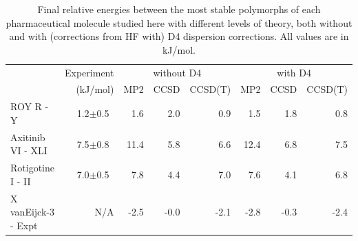 \begin{table}[h]

\caption{\label{tab:final_relative_energies}Final relative energies between the most stable polymorphs of each pharmaceutical molecule studied here with different levels of theory, both without and with (corrections from HF with) D4 dispersion corrections. All values are in kJ/mol.}
\begin{tabular}{lrrrrrrr}
\toprule
 & Experiment & \multicolumn{3}{c}{without D4} & \multicolumn{3}{c}{with D4} \\ \cmidrule(lr){3-5} \cmidrule(lr){6-8} 
 & (kJ/mol) & MP2 & CCSD & CCSD(T) & MP2 & CCSD & CCSD(T) \\
\midrule
ROY R - Y & 1.2$\pm$0.5~\cite{yuPolymorphismMolecularSolids2010b} & 1.6 & 2.0 & 0.9 & 1.5 & 1.8 & 0.8 \\
Axitinib VI - XLI & 7.5$\pm$0.8~\cite{campetaDevelopmentTargetedPolymorph2010a} & 11.4 & 5.8 & 6.6 & 12.4 & 6.8 & 7.5 \\
Rotigotine I - II & 7.0$\pm$0.5~\cite{mortazaviComputationalPolymorphScreening2019} & 7.8 & 4.4 & 7.0 & 7.6 & 4.1 & 6.8 \\
X vanEijck-3 - Expt & N/A & -2.5 & -0.0 & -2.1 & -2.8 & -0.3 & -2.4 \\
\bottomrule
\end{tabular}

\end{table}